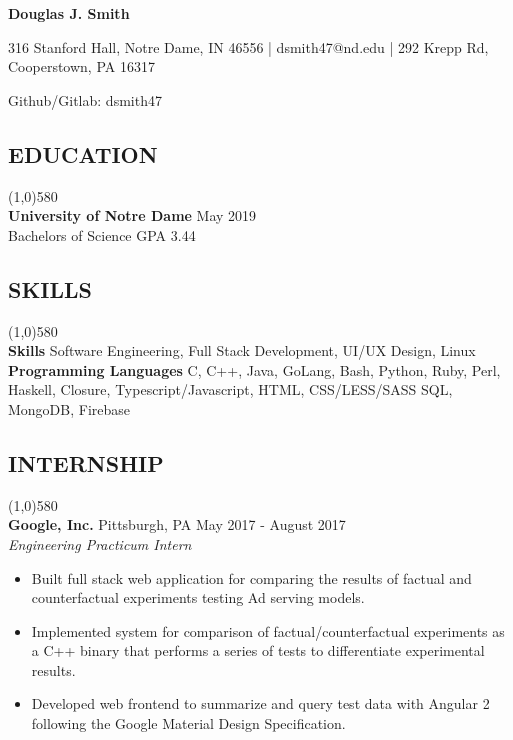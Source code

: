 \documentclass[10pt]{article}
\begin{document}
  \centerline{
    \huge\textbf{Douglas J. Smith}
  }
  \centerline{
    316 Stanford Hall, Notre Dame, IN 46556
    |
    dsmith47@nd.edu
    |
    292 Krepp Rd, Cooperstown, PA 16317
  }
  \centerline{
    Github/Gitlab: dsmith47
  }

  \vspace{-12pt}
  \subsection*{\fontsize{10}{-10}\selectfont EDUCATION}
    \vspace{-16pt}
    \line(1,0){580}\\
    \textbf{University of Notre Dame}
    \hfill
    May 2019
    \\
    Bachelors of Science
    \hfill
    GPA 3.44
    \\
    \vspace{-12pt}
  \vspace{-8pt}
  \subsection*{\fontsize{10}{-10}\selectfont SKILLS}
    \vspace{-16pt}
    \line(1,0){580}\\
    \textbf{Skills}
    Software Engineering,
    Full Stack Development,
    UI/UX Design,
    Linux
    \\
    \textbf{Programming Languages}
    C,
    C++,
    Java,
    GoLang,
    Bash,
    Python,
    Ruby,
    Perl,
    Haskell,
    Closure,
    Typescript/Javascript,
    HTML,
    CSS/LESS/SASS
    SQL,
    MongoDB,
    Firebase
    \\
  
  \vspace{-18pt}
  \subsection*{\fontsize{10}{-10}\selectfont INTERNSHIP}
    \vspace{-16pt}
    \line(1,0){580}\\
    \textbf{Google, Inc.}
    \tab
    Pittsburgh, PA
    \hfill
    May 2017 - August 2017
    \\
    \textit{Engineering Practicum Intern}
    \begin{itemize}
      \item Built full stack web application for comparing the results of factual and counterfactual experiments testing Ad serving models.
      \item Implemented system for comparison of factual/counterfactual experiments as a C++ binary that performs a series of tests to differentiate experimental results.
      \item Developed web frontend to summarize and query test data with Angular 2 following the Google Material Design Specification.
    \end{itemize}
  
\end{document}
